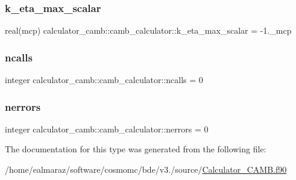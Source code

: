 \subsubsection{\texorpdfstring{k\+\_\+eta\+\_\+max\+\_\+scalar}{k\_eta\_max\_scalar}}
{\footnotesize\ttfamily real(mcp) calculator\+\_\+camb\+::camb\+\_\+calculator\+::k\+\_\+eta\+\_\+max\+\_\+scalar = -\/1.\+\_\+mcp\hspace{0.3cm}{\ttfamily [private]}}

\mbox{\label{structcalculator__camb_1_1camb__calculator_a12f320d27edc9dd7ce21bb813bdb3508}} 
\subsubsection{\texorpdfstring{ncalls}{ncalls}}
{\footnotesize\ttfamily integer calculator\+\_\+camb\+::camb\+\_\+calculator\+::ncalls = 0\hspace{0.3cm}{\ttfamily [private]}}

\mbox{\label{structcalculator__camb_1_1camb__calculator_a5e91a7b9c53af26557d78d1b32852832}} 
\subsubsection{\texorpdfstring{nerrors}{nerrors}}
{\footnotesize\ttfamily integer calculator\+\_\+camb\+::camb\+\_\+calculator\+::nerrors = 0\hspace{0.3cm}{\ttfamily [private]}}



The documentation for this type was generated from the following file\+:\begin{DoxyCompactItemize}
\item 
/home/ealmaraz/software/cosmomc/bde/v3./source/\mbox{\hyperlink{Calculator__CAMB_8f90}{Calculator\+\_\+\+C\+A\+M\+B.\+f90}}\end{DoxyCompactItemize}

